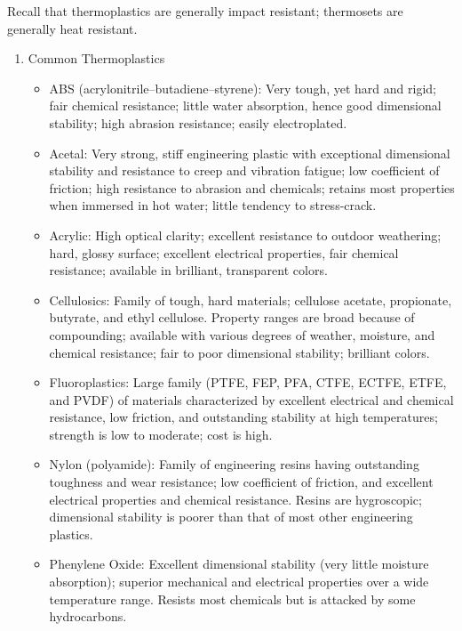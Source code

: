 \documentclass[a4paper,openany,12pt]{book}
\begin{document}
Recall that thermoplastics are generally impact resistant; thermosets
are generally heat resistant.

\begin{enumerate}
\item Common Thermoplastics
\label{common-thermoplastics}
\begin{itemize}
\item ABS (acrylonitrile--butadiene--styrene): Very tough, yet hard and
rigid; fair chemical resistance; little water absorption, hence good
dimensional stability; high abrasion resistance; easily electroplated.

\item Acetal: Very strong, stiff engineering plastic with exceptional
dimensional stability and resistance to creep and vibration fatigue;
low coefficient of friction; high resistance to abrasion and
chemicals; retains most properties when immersed in hot water; little
tendency to stress-crack.

\item Acrylic: High optical clarity; excellent resistance to outdoor
weathering; hard, glossy surface; excellent electrical properties,
fair chemical resistance; available in brilliant, transparent colors.

\item Cellulosics: Family of tough, hard materials; cellulose acetate,
propionate, butyrate, and ethyl cellulose. Property ranges are broad
because of compounding; available with various degrees of weather,
moisture, and chemical resistance; fair to poor dimensional stability;
brilliant colors.

\item Fluoroplastics: Large family (PTFE, FEP, PFA, CTFE, ECTFE, ETFE, and
PVDF) of materials characterized by excellent electrical and chemical
resistance, low friction, and outstanding stability at high
temperatures; strength is low to moderate; cost is high.

\item Nylon (polyamide): Family of engineering resins having outstanding
toughness and wear resistance; low coefficient of friction, and
excellent electrical properties and chemical resistance. Resins are
hygroscopic; dimensional stability is poorer than that of most other
engineering plastics.

\item Phenylene Oxide: Excellent dimensional stability (very little moisture
absorption); superior mechanical and electrical properties over a wide
temperature range. Resists most chemicals but is attacked by some
hydrocarbons.


\end{itemize}
\end{enumerate}
\end{document}
